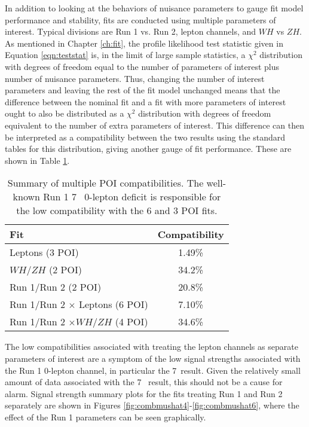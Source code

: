In addition to looking at the behaviors of nuisance parameters to gauge fit model performance and stability, fits are conducted using multiple parameters of interest.  Typical divisions are Run 1 vs. Run 2, lepton channels, and $WH$ vs $ZH$.  As mentioned in Chapter \ref{ch:fit}, the profile likelihood test statistic given in Equation \ref{eqn:teststat} is, in the limit of large sample statistics, a $\chi^2$ distribution with degrees of freedom equal to the number of parameters of interest plus number of nuisance parameters.  Thus, changing the number of interest parameters and leaving the rest of the fit model unchanged means that the difference between the nominal fit and a fit with more parameters of interest ought to also be distributed as a $\chi^2$ distribution with degrees of freedom equivalent to the number of extra parameters of interest.  This difference can then be interpreted as a compatibility between the two results using the standard tables for this distribution, giving another gauge of fit performance.  These are shown in Table \ref{tab:compatibility}.

\begin{table}[!htbp]\captionsetup{justification=centering}
\begin{center}\begin{tabular}{|l|c|}
\hline
Fit & Compatibility \\\hline
Leptons (3 POI) & 1.49\% \\
$WH/ZH$ (2 POI) & 34.2\% \\
Run 1/Run 2 (2 POI) & 20.8\% \\
Run 1/Run 2 $\times$ Leptons (6 POI) & 7.10\% \\
Run 1/Run 2 $\times WH/ZH$  (4 POI) & 34.6\% \\
\hline
\end{tabular}
\caption{Summary of multiple POI compatibilities.  The well-known Run 1 7 \tev\, 0-lepton deficit is responsible for the low compatibility with the 6 and 3 POI fits.}
\label{tab:compatibility}
\end{center}
\end{table}

The low compatibilities associated with treating the lepton channels as separate parameters of interest are a symptom of the low signal strengths associated with the Run 1 0-lepton channel, in particular the 7 \tev\,result.  Given the relatively small amount of data associated with the 7 \tev\, result, this should not be a cause for alarm.  Signal strength summary plots for the fits treating Run 1 and Run 2 separately are shown in Figures \ref{fig:combmushat4}-\ref{fig:combmushat6}, where the effect of the Run 1 parameters can be seen graphically.


